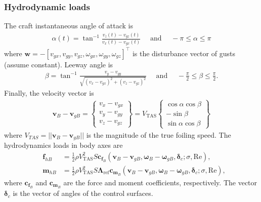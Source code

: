 \documentclass[10pt]{article}
\newcommand{\mbf}[1]{\mathbf{#1}}
\newcommand{\ben}{\begin{eqnarray*}}
\newcommand{\een}{\end{eqnarray*}}
\begin{document}
\subsubsection{Hydrodynamic loads}
% 
The craft instantaneous angle of attack is
\ben
\alpha(t)=\tan^{-1} \frac{v_z(t)-v_{g z}(t)}{v_x(t)-v_{g x}(t)} \quad \text { and } \quad-{\pi} \leq \alpha \leq {\pi}
\een
where $\mbf{w} = -[v_{gx}, v_{gy}, v_{gz}, \omega_{gx}, \omega_{gy}, \omega_{gz}]^{\top}$ is the disturbance vector of gusts (assume constant).
Leeway angle is
\ben
\beta = \tan ^{-1} \frac{v_y-v_{g y}}{\sqrt{\left(v_x-v_{g x}\right)^2+\left(v_z-v_{g z}\right)^2}} \quad \text { and } \quad-\frac{\pi}{2} \leq \beta \leq \frac{\pi}{2}.
\een
% 
Finally, the velocity vector is
\ben
\mbf{v}_B-\mbf{v}_{g B}=\left\{\begin{array}{c}
	v_x-v_{g x} \\
	v_y-v_{g y} \\
	v_z-v_{g z}
\end{array}\right\}=V_{\mathrm{TAS}}\left\{\begin{array}{c}
	\cos \alpha \cos \beta \\
	-\sin \beta            \\
	\sin \alpha \cos \beta
\end{array}\right\}
\een
where $V_{TAS} = ||\mbf{v}_B-\mbf{v}_{g B} ||$ is the magnitude of the true foiling speed.
The hydrodynamics loads in body axes are
\ben
& \mbf{f}_{h B} & =\frac{1}{2} \rho V_{\mathrm{TAS}}^2 S \mathbf{c}_{\mathbf{f}_B}\left(\mathbf{v}_B-\mathbf{v}_{g B}, \boldsymbol{\omega}_B-\boldsymbol{\omega}_{g B}, \boldsymbol{\delta}_c ; \sigma, \mathrm{Re}\right),                                     \\
& \mbf{m}_{h B} & =\frac{1}{2} \rho V_{\mathrm{TAS}}^2 S \boldsymbol{\Lambda}_{\mathrm{ref}} \mathbf{c}_{\mathbf{m}_B}\left(\mathbf{v}_B-\mathbf{v}_{g B}, \boldsymbol{\omega}_B-\boldsymbol{\omega}_{g B}, \boldsymbol{\delta}_c ; \sigma, \mathrm{Re}\right),
\een
where $\mbf{c}_{\mbf{f}_B}$ and $\mbf{c}_{\mbf{m}_B}$ are the force and moment coefficients, respectively.
The vector $\boldsymbol{\delta}_c$ is the vector of angles of the control surfaces.
\end{document}
